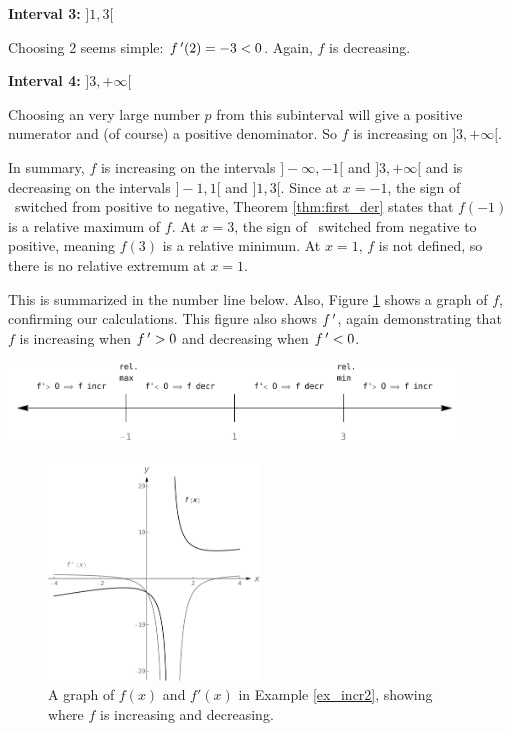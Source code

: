 \begin{example}
\begin{description}
\item\textbf{Interval 3:} $]1,3[$

Choosing 2 seems simple: $f\,'(2) = -3<0$. Again, $f$ is decreasing.

\item \textbf{Interval 4:} $]3,+\infty[$

Choosing an very large number $p$ from this subinterval will give a positive numerator and (of course) a positive denominator. So $f$ is increasing on $]3,+\infty[$.

\end{description}


In summary, $f$ is increasing on the intervals $]-\infty,-1[$ and $]3,+\infty[$ and is decreasing on the intervals $]-1,1[$ and $]1,3[$. Since at $x=-1$, the sign of \fp\ switched from positive to negative, Theorem \ref{thm:first_der} states that $f(-1)$ is a relative maximum of $f$. At $x=3$, the sign of \fp\ switched from negative to positive, meaning $f(3)$ is a relative minimum. At $x=1$, $f$ is not defined, so there is no relative extremum at $x=1$.


This is summarized in the number line below. Also, Figure \ref{fig_behaviour_13} shows a graph of $f$, confirming our calculations. This figure also shows $f\,'$, again demonstrating that $f$ is increasing when $f\,'>0$ and decreasing when $f\,'<0$.

	\begin{center}
			\includegraphics[width=0.9\textwidth]{fig_behaviour_12}
	\end{center}

\begin{figure}[H]
	\begin{center}
			\includegraphics[width=0.5\textwidth]{fig_behaviour_13}
	\caption{A graph of $f(x)$  and $f'(x)$ in Example \ref{ex_incr2}, showing where $f$ is increasing and decreasing.}
	\label{fig_behaviour_13}
	\end{center}
\end{figure}

\end{example}

